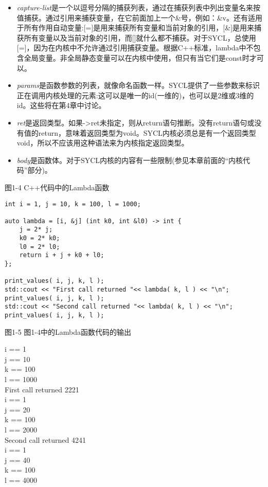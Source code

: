 \begin{itemize}
	\item \textit{capture-list}是一个以逗号分隔的捕获列表，通过在捕获列表中列出变量名来按值捕获。通过引用来捕获变量，在它前面加上一个\&号，例如：\&v。还有适用于所有作用自动变量:[=]是用来捕获所有变量和当前对象的引用，[\&]是用来捕获所有变量以及当前对象的引用，而[]就什么都不捕获。对于SYCL，总使用[=]，因为在内核中不允许通过引用捕获变量。根据C++标准，lambda中不包含全局变量。非全局静态变量可以在内核中使用，但只有当它们是const时才可以。
	\item \textit{params}是函数参数的列表，就像命名函数一样。SYCL提供了一些参数来标识正在调用内核处理的元素:这可以是唯一的id(一维的)，也可以是2维或3维的id。这些将在第4章中讨论。
	\item \textit{ret}是返回类型。如果->ret未指定，则从return语句推断。没有return语句或没有值的return，意味着返回类型为void。SYCL内核必须总是有一个返回类型void，所以不应该用这种语法来为内核指定返回类型。
	\item \textit{body}是函数体。对于SYCL内核的内容有一些限制(参见本章前面的“内核代码”部分)。
\end{itemize}

图1-4 C++代码中的Lambda函数
\begin{lstlisting}[caption={}]
int i = 1, j = 10, k = 100, l = 1000;

auto lambda = [i, &j] (int k0, int &l0) -> int {
	j = 2* j;
	k0 = 2* k0;
	l0 = 2* l0;
	return i + j + k0 + l0;
};

print_values( i, j, k, l );
std::cout << "First call returned "<< lambda( k, l ) << "\n";
print_values( i, j, k, l );
std::cout << "Second call returned "<< lambda( k, l ) << "\n";
print_values( i, j, k, l );
\end{lstlisting}

图1-5 图1-4中的Lambda函数代码的输出
\begin{tcolorbox}[colback=white,colframe=black]
i == 1 \\
j == 10 \\
k == 100 \\
l == 1000 \\
First call returned 2221 \\
i == 1 \\
j == 20 \\
k == 100 \\
l == 2000 \\
Second call returned 4241 \\
i == 1 \\
j == 40 \\
k == 100 \\
l == 4000 
\end{tcolorbox}


